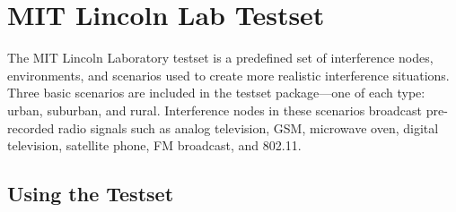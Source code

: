 %  
% 
% 
% 
% 

\chapter{MIT Lincoln Lab Testset}

The MIT Lincoln Laboratory testset is a predefined set of
interference nodes, environments, and scenarios used to create more
realistic interference situations.  Three basic scenarios are
included in the testset package---one of each type: urban, suburban,
and rural. Interference nodes in these scenarios broadcast
pre-recorded radio signals such as analog television, GSM, microwave
oven, digital television, satellite phone, FM broadcast, and 802.11.

\section{Using the Testset}

